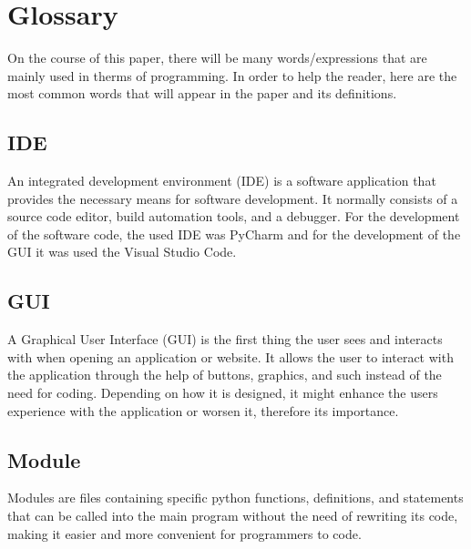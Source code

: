 

\chapter*{Glossary}

\label{cha:glossary}


On the course of this paper, there will be many words/expressions that are mainly used in therms of programming. In order to help the reader, here are the most common words that will appear in the paper and its definitions.

\section*{IDE} 
\label{sub:ide}

An integrated development environment (IDE) is a software application that provides the necessary means for software development. It normally consists of a source code editor, build automation tools, and a debugger.
For the development of the software code, the used IDE was PyCharm and for the development of the GUI it was used the Visual Studio Code.

\section*{GUI} 
\label{sub:gui}

A Graphical User Interface (GUI) is the first thing the user sees and interacts with when opening an application or website. It allows the user to interact with the application through the help of buttons, graphics, and such instead of the need for coding.
Depending on how it is designed, it might enhance the users experience with the application or worsen it, therefore its importance.

\section*{Module} 
\label{sub:module}

Modules are files containing specific python functions, definitions, and statements that can be called into the main program without the need of rewriting its code, making it easier and more convenient for programmers to code.

